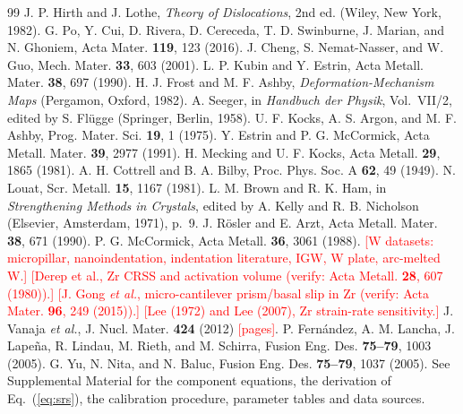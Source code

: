 \documentclass[aps,prl,twocolumn,superscriptaddress,amsmath,amssymb,floatfix]{revtex4-2}
\newcommand{\todo}[1]{\textcolor{red}{[#1]}}
\begin{document}
\begin{thebibliography}{99}
 J. P. Hirth and J. Lothe, \emph{Theory of Dislocations}, 2nd ed. (Wiley, New York, 1982).
 G. Po, Y. Cui, D. Rivera, D. Cereceda, T. D. Swinburne, J. Marian, and N. Ghoniem, Acta Mater. \textbf{119}, 123 (2016).
 J. Cheng, S. Nemat-Nasser, and W. Guo, Mech. Mater. \textbf{33}, 603 (2001).
 L. P. Kubin and Y. Estrin, Acta Metall. Mater. \textbf{38}, 697 (1990).
 H. J. Frost and M. F. Ashby, \emph{Deformation-Mechanism Maps} (Pergamon, Oxford, 1982).
 A. Seeger, in \emph{Handbuch der Physik}, Vol.~VII/2, edited by S. Fl\"ugge (Springer, Berlin, 1958).
 U. F. Kocks, A. S. Argon, and M. F. Ashby, Prog. Mater. Sci. \textbf{19}, 1 (1975).
 Y. Estrin and P. G. McCormick, Acta Metall. Mater. \textbf{39}, 2977 (1991).
 H. Mecking and U. F. Kocks, Acta Metall. \textbf{29}, 1865 (1981).
 A. H. Cottrell and B. A. Bilby, Proc. Phys. Soc. A \textbf{62}, 49 (1949).
 N. Louat, Scr. Metall. \textbf{15}, 1167 (1981).
 L. M. Brown and R. K. Ham, in \emph{Strengthening Methods in Crystals}, edited by A. Kelly and R. B. Nicholson (Elsevier, Amsterdam, 1971), p.~9.
 J. R\"osler and E. Arzt, Acta Metall. Mater. \textbf{38}, 671 (1990).
 P. G. McCormick, Acta Metall. \textbf{36}, 3061 (1988).
 \todo{W datasets: micropillar, nanoindentation, indentation literature, IGW, W plate, arc-melted W.}
 \todo{Derep et al., Zr CRSS and activation volume (verify: Acta Metall. \textbf{28}, 607 (1980)).}
 \todo{J. Gong \emph{et al.}, micro-cantilever prism/basal slip in Zr (verify: Acta Mater. \textbf{96}, 249 (2015)).}
 \todo{Lee (1972) and Lee (2007), Zr strain-rate sensitivity.}
 J. Vanaja \emph{et al.}, J. Nucl. Mater. \textbf{424} (2012) \todo{pages}.
 P. Fern\'andez, A. M. Lancha, J. Lape\~na, R. Lindau, M. Rieth, and M. Schirra, Fusion Eng. Des. \textbf{75--79}, 1003 (2005).
 G. Yu, N. Nita, and N. Baluc, Fusion Eng. Des. \textbf{75--79}, 1037 (2005).
 See Supplemental Material for the component equations, the derivation of Eq.~(\ref{eq:srs}), the calibration procedure, parameter tables and data sources.
\end{thebibliography}
\end{document}

